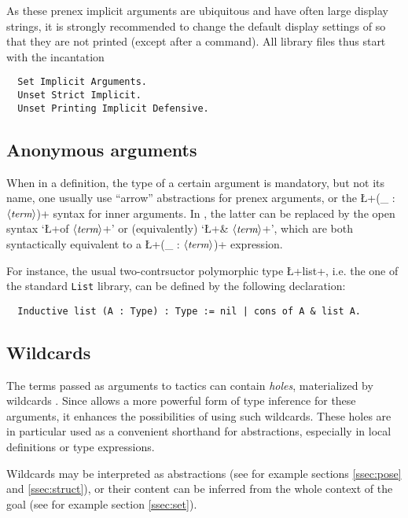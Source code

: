 As these prenex implicit arguments are ubiquitous and have often large
display strings, it is strongly recommended to change the default
display settings of \Coq{} so that they are not printed (except after a
 command).
All \ssr{} library files thus start with the incantation
\begin{lstlisting}
  Set Implicit Arguments.
  Unset Strict Implicit.
  Unset Printing Implicit Defensive.
\end{lstlisting}

\subsection{Anonymous arguments}
When in a definition, the type of a certain argument is mandatory, but
not its name, one usually use ``arrow'' abstractions for prenex
arguments, or the \L+(_ : $\langle\mbox{\itshape\rmfamily\small term}\rangle$)+ syntax for inner arguments.
In \ssr{}, the latter can be replaced by the open syntax `\L+of $\langle\mbox{\itshape\rmfamily\small term}\rangle$+'
or (equivalently)  `\L+& $\langle\mbox{\itshape\rmfamily\small term}\rangle$+', which are both syntactically
equivalent to a \L+(_ : $\langle\mbox{\itshape\rmfamily\small term}\rangle$)+ expression.

For instance, the usual two-contrsuctor polymorphic type \L+list+,
i.e. the one of the
standard {\tt List} library, can be defined by the following
declaration:
\begin{lstlisting}
  Inductive list (A : Type) : Type := nil | cons of A & list A.
\end{lstlisting}

\subsection{Wildcards}\label{ssec:wild}

The terms passed as arguments
to \ssr{} tactics can contain \emph{holes}, materialized by wildcards
\C{_}.
Since \ssr{} allows a more powerful form of type inference for these
arguments, it enhances the possibilities of using such wildcards.
These holes are in particular used as a convenient shorthand for
abstractions, especially in local definitions or type expressions.

Wildcards may be interpreted as abstractions (see for example sections
\ref{ssec:pose} and \ref{ssec:struct}), or their content can be
inferred from the whole
context of the goal (see for example section \ref{ssec:set}).
